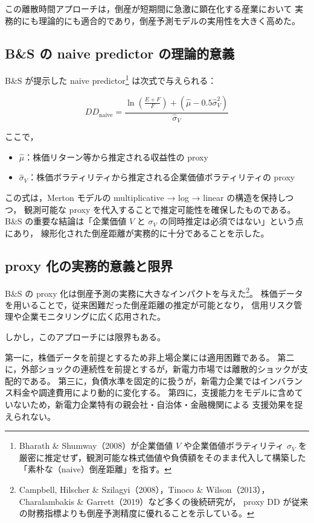 この離散時間アプローチは，倒産が短期間に急激に顕在化する産業において
実務的にも理論的にも適合的であり，倒産予測モデルの実用性を大きく高めた。

\subsection{B\&S の naive predictor の理論的意義}

B\&S が提示した naive predictor\footnote{
Bharath \& Shumway（2008）が企業価値 $V$ や企業価値ボラティリティ $\sigma_V$ を
厳密に推定せず，観測可能な株式価値や負債額をそのまま代入して構築した
「素朴な（naive）倒産距離」を指す。
} は次式で与えられる：



\[
DD_{\text{naive}}
= \frac{\ln\left(\frac{E+F}{F}\right) + (\hat{\mu}-0.5\hat{\sigma}_V^2)}{\hat{\sigma}_V}
\]



ここで，
\begin{itemize}
    \item $\hat{\mu}$：株価リターン等から推定される収益性の proxy  
    \item $\hat{\sigma}_V$：株価ボラティリティから推定される企業価値ボラティリティの proxy  
\end{itemize}

この式は，Merton モデルの multiplicative → log → linear の構造を保持しつつ，
観測可能な proxy を代入することで推定可能性を確保したものである。
B\&S の重要な結論は「企業価値 $V$ と $\sigma_V$ の同時推定は必須ではない」という点にあり，
線形化された倒産距離が実務的に十分であることを示した。

\subsection{proxy 化の実務的意義と限界}

B\&S の proxy 化は倒産予測の実務に大きなインパクトを与えた\footnote{
Campbell, Hilscher \& Szilagyi（2008），Tinoco \& Wilson（2013），
Charalambakis \& Garrett（2019）など多くの後続研究が，
proxy DD が従来の財務指標よりも倒産予測精度に優れることを示している。
}。
株価データを用いることで，従来困難だった倒産距離の推定が可能となり，
信用リスク管理や企業モニタリングに広く応用された。

しかし，このアプローチには限界もある。

第一に，株価データを前提とするため非上場企業には適用困難である。  
第二に，外部ショックの連続性を前提とするが，新電力市場では離散的ショックが支配的である。  
第三に，負債水準を固定的に扱うが，新電力企業ではインバランス料金や調達費用により動的に変化する。  
第四に，支援能力をモデルに含めていないため，新電力企業特有の親会社・自治体・金融機関による
支援効果を捉えられない。

